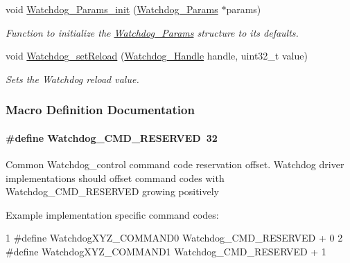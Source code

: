 \begin{DoxyCompactItemize}
void \hyperlink{_watchdog_8h_a6a6f54cfdac33d3bf33464a212262afc}{Watchdog\+\_\+\+Params\+\_\+init} (\hyperlink{struct_watchdog___params}{Watchdog\+\_\+\+Params} $\ast$params)
\begin{DoxyCompactList}\small\item\em Function to initialize the \hyperlink{struct_watchdog___params}{Watchdog\+\_\+\+Params} structure to its defaults. \end{DoxyCompactList}\item 
void \hyperlink{_watchdog_8h_a77ec81e1304fe05b77a9976e10e2d9a3}{Watchdog\+\_\+set\+Reload} (\hyperlink{_watchdog_8h_a00ed22749c947ef200434eeec507f90d}{Watchdog\+\_\+\+Handle} handle, uint32\+\_\+t value)
\begin{DoxyCompactList}\small\item\em Sets the Watchdog reload value. \end{DoxyCompactList}\end{DoxyCompactItemize}


\subsubsection{Macro Definition Documentation}
\paragraph[{Watchdog\+\_\+\+C\+M\+D\+\_\+\+R\+E\+S\+E\+R\+V\+E\+D}]{\setlength{\rightskip}{0pt plus 5cm}\#define Watchdog\+\_\+\+C\+M\+D\+\_\+\+R\+E\+S\+E\+R\+V\+E\+D~32}\label{_watchdog_8h_a4d1b16e67bf555b8fe49182eb8a28b97}
Common Watchdog\+\_\+control command code reservation offset. Watchdog driver implementations should offset command codes with Watchdog\+\_\+\+C\+M\+D\+\_\+\+R\+E\+S\+E\+R\+V\+E\+D growing positively

Example implementation specific command codes\+: 
\begin{DoxyCode}
1 #define WatchdogXYZ\_COMMAND0         Watchdog\_CMD\_RESERVED + 0
2 #define WatchdogXYZ\_COMMAND1         Watchdog\_CMD\_RESERVED + 1
\end{DoxyCode}

